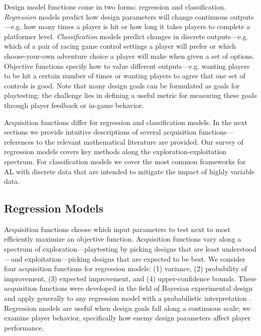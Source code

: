 \documentclass{sig-alternate}
\begin{document}
Design model functions come in two forms: regression and classification.
\textit{Regression} models predict how design parameters will change continuous outputs---e.g. how many times a player is hit or how long it takes players to complete a platformer level.
\textit{Classification} models predict changes in discrete outputs---e.g. which of a pair of racing game control settings a player will prefer or which choose-your-own adventure choice a player will make when given a set of options.
Objective functions specify how to value different outputs---e.g. wanting players to be hit a certain number of times or wanting players to agree that one set of controls is good.
Note that many design goals can be formulated as goals for playtesting: the challenge lies in defining a useful metric for measuring these goals through player feedback or in-game behavior.

Acquisition functions differ for regression and classification models.
In the next sections we provide intuitive descriptions of several acquisition functions---references to the relevant mathematical literature are provided.
Our survey of regression models covers key methods along the exploration-exploitation spectrum.
For classification models we cover the most common frameworks for AL with discrete data that are intended to mitigate the impact of highly variable data.



\subsection{Regression Models}
Acquisition functions choose which input parameters to test next to most efficiently maximize an objective function.
Acquisition functions vary along a spectrum of exploration---playtesting by picking designs that are least understood---and exploitation---picking designs that are expected to be best.
We consider four acquisition functions for regression models: (1) variance, (2) probability of improvement, (3) expected improvement, and (4) upper-confidence bounds.
These acquisition functions were developed in the field of Bayesian experimental design and apply generally to any regression model with a probabilistic interpretation \cite{brochu2010:thesis, chaloner1995}.
Regression models are useful when design goals fall along a continuous scale; we examine player behavior, specifically how enemy design parameters affect player performance.
\end{document}
